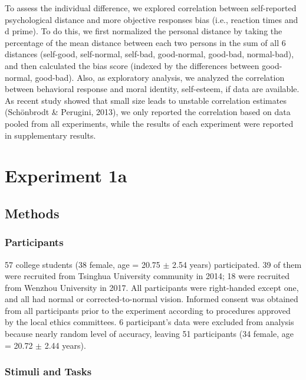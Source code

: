 \documentclass[man]{apa6}
\begin{document}
To assess the individual difference, we explored correlation between self-reported psychological distance and more objective responses bias (i.e., reaction times and d prime). To do this, we first normalized the personal distance by taking the percentage of the mean distance between each two persons in the sum of all 6 distances (self-good, self-normal, self-bad, good-normal, good-bad, normal-bad), and then calculated the bias score (indexed by the differences between good-normal, good-bad). Also, as exploratory analysis, we analyzed the correlation between behavioral response and moral identity, self-esteem, if data are available. As recent study showed that small size leads to unstable correlation estimates (Schönbrodt \& Perugini, 2013), we only reported the correlation based on data pooled from all experiments, while the results of each experiment were reported in supplementary results.

\hypertarget{experiment-1a}{%
\section{Experiment 1a}\label{experiment-1a}}

\hypertarget{methods}{%
\subsection{Methods}\label{methods}}

\hypertarget{participants}{%
\subsubsection{Participants}\label{participants}}

57 college students (38 female, age = 20.75 \(\pm\) 2.54 years) participated. 39 of them were recruited from Tsinghua University community in 2014; 18 were recruited from Wenzhou University in 2017. All participants were right-handed except one, and all had normal or corrected-to-normal vision. Informed consent was obtained from all participants prior to the experiment according to procedures approved by the local ethics committees. 6 participant's data were excluded from analysis because nearly random level of accuracy, leaving 51 participants (34 female, age = 20.72 \(\pm\) 2.44 years).

\hypertarget{stimuli-and-tasks}{%
\subsubsection{Stimuli and Tasks}\label{stimuli-and-tasks}}
\end{document}
